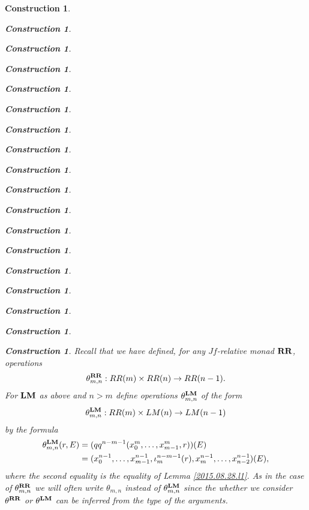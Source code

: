 \documentclass[12pt]{amsart}
\numberwithin{proposition}{subsection}
\newtheorem{construction}[proposition]{Construction}
\newcommand{\llabel}[1]{\label{#1}}
\newcommand{\sr}{\rightarrow}
\newcommand{\RR}{{\bf RR}}
\newcommand{\LM}{{\bf LM}}
\begin{document}
\begin{construction}
\begin{construction}
\begin{construction}
\begin{construction}
\begin{construction}
\begin{construction}
\begin{construction}
\begin{construction}
\begin{construction}
\begin{construction}
\begin{construction}
\begin{construction}
\begin{construction}
\begin{construction}
\begin{construction}
\begin{construction}
\begin{construction}
\begin{construction}
Recall that we have defined, for any $Jf$-relative monad $\RR$, operations 
%
$$\theta^{\RR}_{m,n}:RR(m)\times RR(n)\sr RR(n-1).$$
% 
For $\LM$ as above and $n>m$ define operations $\theta^{\LM}_{m,n}$ of the form
%
$$\theta^{\LM}_{m,n}:RR(m)\times LM(n)\sr LM(n-1)$$
%
by the formula
%
\begin{equation}\llabel{2015.09.07.eq2}
  \begin{split}
    \theta^{\LM}_{m,n}(r,E)&=(qq^{n-m-1}(x_0^m,\dots,x_{m-1}^m,r))(E)\\
                          &=(x_0^{n-1},\dots,x_{m-1}^{n-1},\iota_m^{n-m-1}(r),x_m^{n-1},\dots, x_{n-2}^{n-1})(E),
  \end{split}
\end{equation}%
%
where the second equality is the equality of Lemma \ref{2015.08.28.l1}. As in
the case of $\theta^{\RR}_{m,n}$ we will often write $\theta_{m,n}$ instead of
$\theta^{\LM}_{m,n}$ since the whether we consider $\theta^{\RR}$ or
$\theta^{\LM}$ can be inferred from the type of the arguments.


\end{construction}
\end{construction}
\end{construction}
\end{construction}
\end{construction}
\end{construction}
\end{construction}
\end{construction}
\end{construction}
\end{construction}
\end{construction}
\end{construction}
\end{construction}
\end{construction}
\end{construction}
\end{construction}
\end{construction}
\end{construction}
\end{document}
